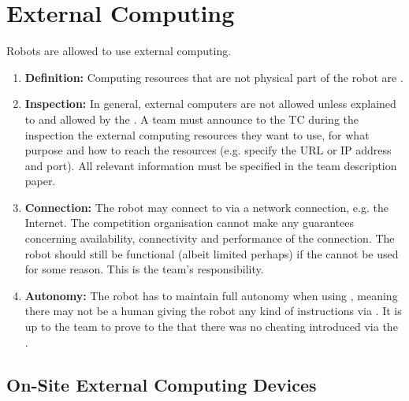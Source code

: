 \section{External Computing}\label{rule:robot_external_computing}
Robots are allowed to use external computing. 
\begin{enumerate}
	\item \textbf{Definition:} Computing resources that are not physical part of the robot are . 
	\item \textbf{Inspection:} In general, external computers are not allowed unless explained to and allowed by the .
	  A team must announce to the TC during the inspection the external computing resources they want to use, for what purpose and how to reach the resources (e.g. specify the URL or IP address and port).
	All relevant information must be specified in the team description paper.
	\item \textbf{Connection:} The robot may connect to  via a network connection, e.g. the Internet. 
	  The competition organisation cannot make any guarantees concerning availability, connectivity and performance of the connection. 
	  The robot should still be functional (albeit limited perhaps) if the  cannot be used for some reason.
	  This is the team's responsibility. 
	\item \textbf{Autonomy:} The robot has to maintain full autonomy when using , 
	  meaning there may not be a human giving the robot any kind of instructions via .
	  It is up to the team to prove to the  that there was no cheating introduced via the . 
\end{enumerate}

\subsection{On-Site External Computing Devices}
\label{rule:robot_external_computing_devices}


